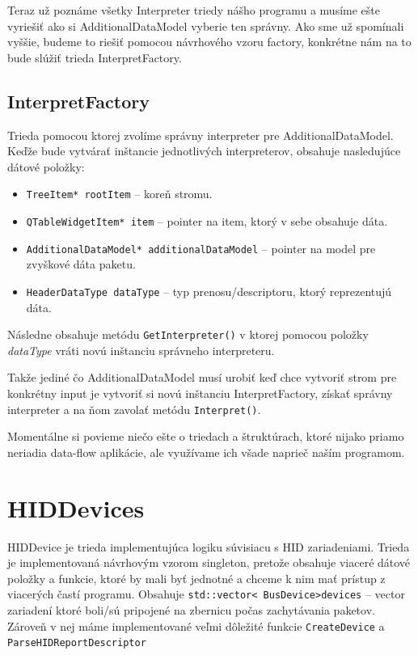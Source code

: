 Teraz už poznáme všetky Interpreter triedy nášho programu a musíme ešte vyriešiť ako si AdditionalDataModel vyberie ten správny. Ako sme už spomínali vyššie, budeme to riešiť pomocou návrhového vzoru factory, konkrétne nám na to bude slúžiť trieda InterpretFactory.

\subsection{InterpretFactory}
Trieda pomocou ktorej zvolíme správny interpreter pre AdditionalDataModel. Keďže bude vytvárať inštancie jednotlivých interpreterov, obsahuje nasledujúce dátové položky:
\begin{itemize}
\item \texttt{TreeItem* rootItem} -- koreň stromu.
\item \texttt{QTableWidgetItem* item} -- pointer na item, ktorý v sebe obsahuje dáta.
\item \texttt{AdditionalDataModel* additionalDataModel} -- pointer na model \newline pre zvyškové dáta paketu.
\item \texttt{HeaderDataType dataType} -- typ prenosu/descriptoru, ktorý reprezentujú dáta.
\end{itemize}
Následne obsahuje metódu \texttt{GetInterpreter()} v ktorej pomocou položky \textit{dataType} vráti novú inštanciu správneho interpreteru. 

Takže jediné čo AdditionalDataModel musí urobiť keď chce vytvoriť strom pre konkrétny input je vytvoriť si novú inštanciu InterpretFactory, získať správny interpreter a na ňom zavolať metódu \texttt{Interpret()}.

Momentálne si povieme niečo ešte o triedach a štruktúrach, ktoré nijako priamo neriadia data-flow aplikácie, ale využívame ich všade naprieč naším programom.

\section{HIDDevices}
HIDDevice je trieda implementujúca logiku súvisiacu s HID zariadeniami. Trieda je implementovaná návrhovým vzorom singleton, pretože obsahuje viaceré dátové položky a funkcie, ktoré by mali byť jednotné a chceme k nim mať prístup z viacerých častí programu. Obsahuje \texttt{std::vector\textless~BusDevice\textgreater devices} -- vector zariadení ktoré boli/sú pripojené na zbernicu počas zachytávania paketov. Zároveň v nej máme implementované veľmi dôležité funkcie \texttt{CreateDevice} a \texttt{ParseHIDReportDescriptor}

